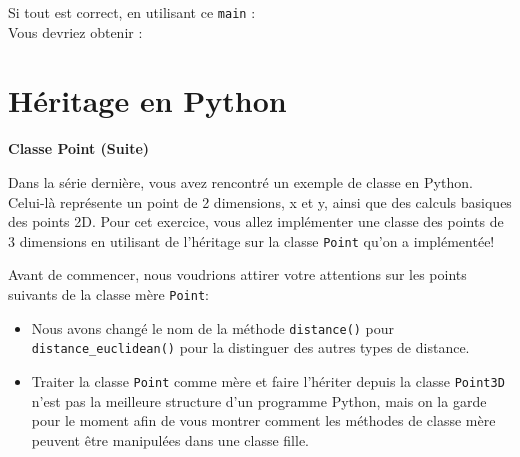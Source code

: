 Si tout est correct, en utilisant ce \lstinline{main} : \\

 

Vous devriez obtenir : \\

 

	\section{Héritage en Python \optionnel}
	\begin{Exercice}[10 minutes]\textbf{Classe Point (Suite)}

	Dans la série dernière, vous avez rencontré un exemple de classe en Python. Celui-là représente un point de 2 dimensions, x et y, ainsi que des calculs basiques des points 2D. Pour cet exercice, vous allez implémenter une classe des points de 3 dimensions en utilisant de l'héritage sur la classe \lstinline{Point} qu'on a implémentée! 


	Avant de commencer, nous voudrions attirer votre attentions sur les points suivants de la classe mère \lstinline{Point}:
	\begin{itemize}
		\item Nous avons changé le nom de la méthode \lstinline{distance()} pour \lstinline{distance_euclidean()} pour la distinguer des autres types de distance. 
		\item Traiter la classe \lstinline{Point} comme mère et faire l'hériter depuis la classe \lstinline{Point3D} n'est pas la meilleure structure d'un programme Python, mais on la garde pour le moment afin de vous montrer comment les méthodes de classe mère peuvent être manipulées dans une classe fille.
	\end{itemize}


\end{Exercice}
